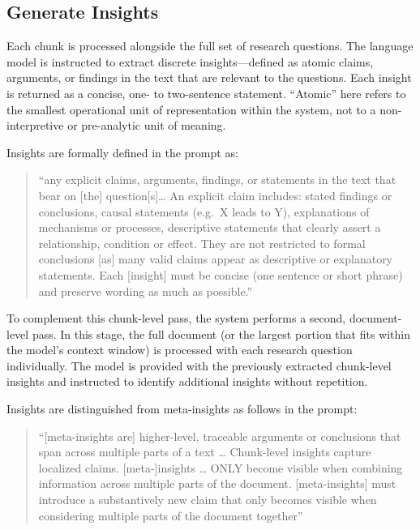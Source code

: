 \documentclass[
  11pt,
]{article}
\begin{document}
\subsection{Generate Insights}\label{generate-insights}

Each chunk is processed alongside the full set of research questions.
The language model is instructed to extract discrete insights---defined
as atomic claims, arguments, or findings in the text that are relevant
to the questions. Each insight is returned as a concise, one- to
two-sentence statement. ``Atomic'' here refers to the smallest
operational unit of representation within the system, not to a
non-interpretive or pre-analytic unit of meaning.

Insights are formally defined in the prompt as:

\begin{quote}
``any explicit claims, arguments, findings, or statements in the text
that bear on {[}the{]} question{[}s{]}\ldots{} An explicit claim
includes: stated findings or conclusions, causal statements (e.g.~X
leads to Y), explanations of mechanisms or processes, descriptive
statements that clearly assert a relationship, condition or effect. They
are not restricted to formal conclusions {[}as{]} many valid claims
appear as descriptive or explanatory statements. Each {[}insight{]} must
be concise (one sentence or short phrase) and preserve wording as much
as possible.''
\end{quote}

To complement this chunk-level pass, the system performs a second,
document-level pass. In this stage, the full document (or the largest
portion that fits within the model's context window) is processed with
each research question individually. The model is provided with the
previously extracted chunk-level insights and instructed to identify
additional insights without repetition.

Insights are distinguished from meta-insights as follows in the prompt:

\begin{quote}
``{[}meta-insights are{]} higher-level, traceable arguments or
conclusions that span across multiple parts of a text \ldots{}
Chunk-level insights capture localized claims. {[}meta-{]}insights
\ldots{} ONLY become visible when combining information across multiple
parts of the document. {[}meta-insights{]} must introduce a
substantively new claim that only becomes visible when considering
multiple parts of the document together''
\end{quote}
\end{document}
